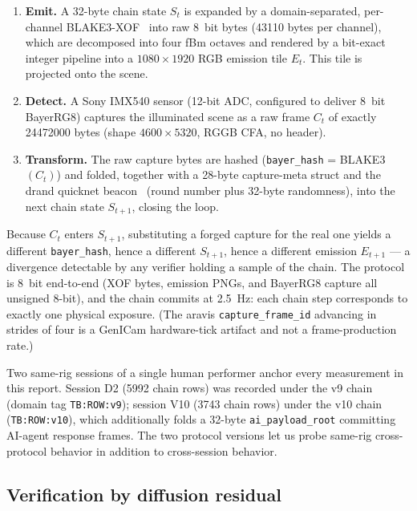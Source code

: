 \begin{enumerate}
  \item \textbf{Emit.} A 32-byte chain state $S_t$ is expanded by a domain-separated, per-channel BLAKE3-XOF~\cite{blake3} into raw \SI{8}{bit} bytes (\num{43110} bytes per channel), which are decomposed into four fBm octaves and rendered by a bit-exact integer pipeline into a $1080 \times 1920$ RGB emission tile $E_t$. This tile is projected onto the scene.
  \item \textbf{Detect.} A Sony IMX540 sensor (12-bit ADC, configured to deliver \SI{8}{bit} BayerRG8) captures the illuminated scene as a raw frame $C_t$ of exactly \num{24472000} bytes (shape $4600 \times 5320$, RGGB CFA, no header).
  \item \textbf{Transform.} The raw capture bytes are hashed (\texttt{bayer\_hash} = BLAKE3$(C_t)$) and folded, together with a 28-byte capture-meta struct and the drand quicknet beacon~\cite{drandbeacon} (round number plus 32-byte randomness), into the next chain state $S_{t+1}$, closing the loop.
\end{enumerate}

Because $C_t$ enters $S_{t+1}$, substituting a forged capture for the real one yields a different \texttt{bayer\_hash}, hence a different $S_{t+1}$, hence a different emission $E_{t+1}$ --- a divergence detectable by any verifier holding a sample of the chain. The protocol is \SI{8}{bit} end-to-end (XOF bytes, emission PNGs, and BayerRG8 capture all unsigned 8-bit), and the chain commits at \SI{2.5}{\hertz}: each chain step corresponds to exactly one physical exposure. (The aravis \texttt{capture\_frame\_id} advancing in strides of four is a GenICam hardware-tick artifact and not a frame-production rate.)

Two same-rig sessions of a single human performer anchor every measurement in this report. Session D2 (\num{5992} chain rows) was recorded under the v9 chain (domain tag \texttt{TB:ROW:v9}); session V10 (\num{3743} chain rows) under the v10 chain (\texttt{TB:ROW:v10}), which additionally folds a 32-byte \texttt{ai\_payload\_root} committing AI-agent response frames. The two protocol versions let us probe same-rig cross-protocol behavior in addition to cross-session behavior.

\subsection{Verification by diffusion residual}

